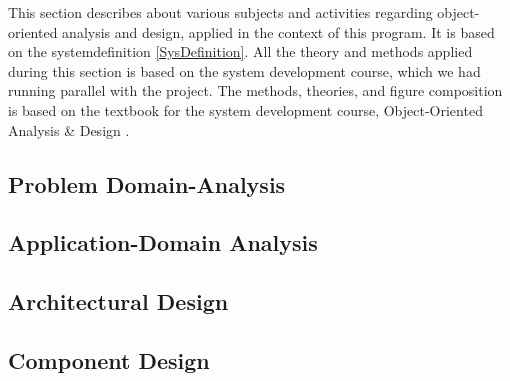 This section describes about various subjects and activities regarding object-oriented analysis and design, applied in the context of this program. It is based on the systemdefinition \ref{SysDefinition}. All the theory and methods applied during this section is based on the system development course, which we had running parallel with the project. The methods, theories, and figure composition is based on the textbook for the system development course, Object-Oriented Analysis \& Design \cite{ObjektAnalyseDesign}.

\subsection{Problem Domain-Analysis}
\label{ProblemDomain}

\subsection{Application-Domain Analysis}
\label{ApplicationDomain}

\subsection{Architectural Design}
\label{ArchDes}

\subsection{Component Design}
\label{ComponentDesign}
